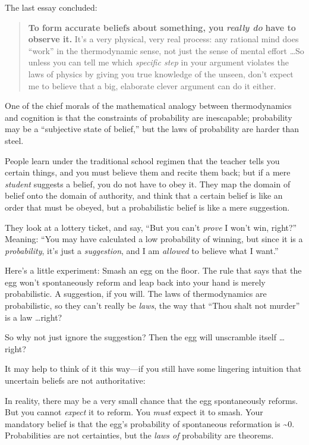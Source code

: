 {
 The last essay concluded:}

\begin{quote}
{
 \textbf{To form accurate beliefs about something, you
}\textbf{\textit{really do}}\textbf{ have to observe it.}
It's a very physical, very real process: any rational
mind does ``work'' in the
thermodynamic sense, not just the sense of mental effort \ldots So
unless you can tell me which \textit{specific step} in your argument
violates the laws of physics by giving you true knowledge of the
unseen, don't expect me to believe that a big,
elaborate clever argument can do it either.}
\end{quote}

{
 One of the chief morals of the mathematical analogy between
thermodynamics and cognition is that the constraints of probability are
inescapable; probability may be a ``subjective state
of belief,'' but the laws of probability are harder
than steel.}

{
 People learn under the traditional school regimen that the teacher
tells you certain things, and you must believe them and recite them
back; but if a mere \textit{student} suggests a belief, you do not have
to obey it. They map the domain of belief onto the domain of authority,
and think that a certain belief is like an order that must be obeyed,
but a probabilistic belief is like a mere suggestion.}

{
 They look at a lottery ticket, and say, ``But you
can't \textit{prove} I won't win,
right?'' Meaning: ``You may have
calculated a low probability of winning, but since it is a
\textit{probability}, it's just a \textit{suggestion},
and I am \textit{allowed} to believe what I want.''}

{
 Here's a little experiment: Smash an egg on the
floor. The rule that says that the egg won't
spontaneously reform and leap back into your hand is merely
probabilistic. A suggestion, if you will. The laws of thermodynamics
are probabilistic, so they can't really be
\textit{laws}, the way that ``Thou shalt not
murder'' is a law \ldots right?}

{
 So why not just ignore the suggestion? Then the egg will
unscramble itself \ldots right?}

{
 It may help to think of it this way---if you still have some
lingering intuition that uncertain beliefs are not authoritative:}

{
 In reality, there may be a very small chance that the egg
spontaneously reforms. But you cannot \textit{expect} it to reform. You
\textit{must} expect it to smash. Your mandatory belief is that the
egg's probability of spontaneous reformation is \~{}0.
Probabilities are not certainties, but the \textit{laws of} probability
are theorems.}

